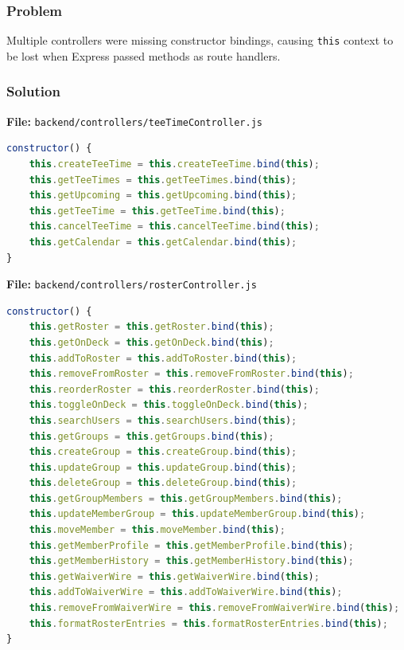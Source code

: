 \documentclass[11pt,a4paper]{article}
\begin{document}
\subsubsection{Problem}
Multiple controllers were missing constructor bindings, causing \texttt{this} context to be lost when Express passed methods as route handlers.

\subsubsection{Solution}

\textbf{File:} \texttt{backend/controllers/teeTimeController.js}
\begin{lstlisting}[language=JavaScript]
constructor() {
    this.createTeeTime = this.createTeeTime.bind(this);
    this.getTeeTimes = this.getTeeTimes.bind(this);
    this.getUpcoming = this.getUpcoming.bind(this);
    this.getTeeTime = this.getTeeTime.bind(this);
    this.cancelTeeTime = this.cancelTeeTime.bind(this);
    this.getCalendar = this.getCalendar.bind(this);
}
\end{lstlisting}

\textbf{File:} \texttt{backend/controllers/rosterController.js}
\begin{lstlisting}[language=JavaScript]
constructor() {
    this.getRoster = this.getRoster.bind(this);
    this.getOnDeck = this.getOnDeck.bind(this);
    this.addToRoster = this.addToRoster.bind(this);
    this.removeFromRoster = this.removeFromRoster.bind(this);
    this.reorderRoster = this.reorderRoster.bind(this);
    this.toggleOnDeck = this.toggleOnDeck.bind(this);
    this.searchUsers = this.searchUsers.bind(this);
    this.getGroups = this.getGroups.bind(this);
    this.createGroup = this.createGroup.bind(this);
    this.updateGroup = this.updateGroup.bind(this);
    this.deleteGroup = this.deleteGroup.bind(this);
    this.getGroupMembers = this.getGroupMembers.bind(this);
    this.updateMemberGroup = this.updateMemberGroup.bind(this);
    this.moveMember = this.moveMember.bind(this);
    this.getMemberProfile = this.getMemberProfile.bind(this);
    this.getMemberHistory = this.getMemberHistory.bind(this);
    this.getWaiverWire = this.getWaiverWire.bind(this);
    this.addToWaiverWire = this.addToWaiverWire.bind(this);
    this.removeFromWaiverWire = this.removeFromWaiverWire.bind(this);
    this.formatRosterEntries = this.formatRosterEntries.bind(this);
}
\end{lstlisting}

\end{document}
